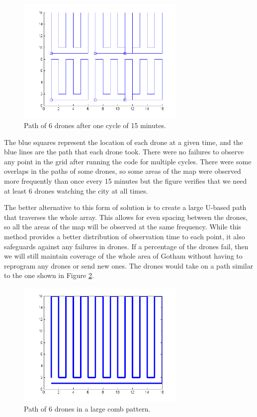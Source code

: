\documentclass{article}
\begin{document}
\begin{figure}[htb!]
\begin{center}
\includegraphics[width=3.2in]{M1Path.png}
\end{center}
\caption{Path of 6 drones after one cycle of 15 minutes.
\label{M1Path}}
\end{figure} 

The blue squares represent the location of each drone at a given time, and the blue lines are the path that each drone took. There were no failures to observe any point in the grid after running the code for multiple cycles. There were some overlaps in the paths of some drones, so some areas of the map were observed more frequently than once every 15 minutes but the figure verifies that we need at least 6 drones watching the city at all times.

The better alternative to this form of solution is to create a large U-based path that traverses the whole array. This allows for even spacing between the drones, so all the areas of the map will be observed at the same frequency. While this method provides a better distribution of observation time to each point, it also safeguards against any failures in drones. If a percentage of the drones fail, then we will still maintain coverage of the whole area of Gotham without having to reprogram any drones or send new ones. The drones would take on a path similar to the one shown in Figure \ref{Comb}.  

\begin{figure}[htb!]
\begin{center}
\includegraphics[width=3.2in]{Comb.png}
\end{center}
\caption{Path of 6 drones in a large comb pattern.
\label{Comb}}
\end{figure}
\end{document}
